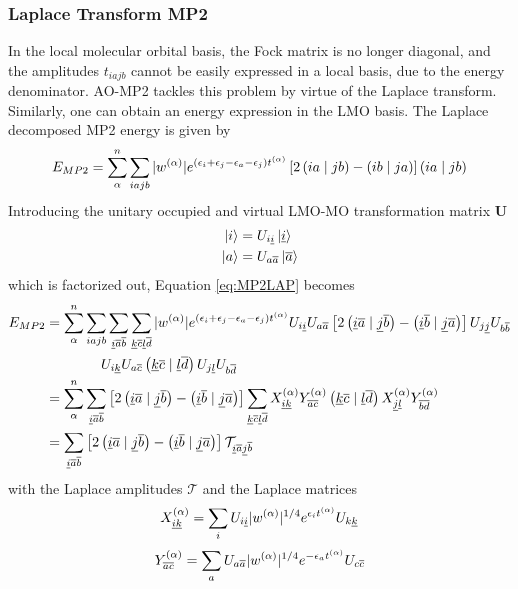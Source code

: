 \subsubsection{Laplace Transform MP2}

In the local molecular orbital basis, the Fock matrix is no longer diagonal, and the amplitudes $t_{iajb}$ cannot be easily expressed in a local basis, due to the energy denominator. AO-MP2 tackles this problem by virtue of the Laplace transform. Similarly, one can obtain an energy expression in the LMO basis. The Laplace decomposed MP2 energy is given by
\begin{equation}
E_{MP2} = \sum_{\alpha}^{n} \sum_{iajb} |w\pa| e^{(\eps_i + \eps_j - \eps_a - \eps_j)t\pa} \left[2\cn{ia}{jb} - \cn{ib}{ja}\right] \cn{ia}{jb}  
\label{eq:MP2LAP}
\end{equation}
\noindent Introducing the unitary occupied and virtual LMO-MO transformation matrix $\mathbf{U}$ 
\begin{align}
\ket{i} &= U_{i\underline{i}} \ket{\underline{i}}
\\
\ket{a} &= U_{a\overline{a}} \ket{\overline{a}}
\end{align}
\noindent which is factorized out, Equation \ref{eq:MP2LAP} becomes
\begin{equation}
\begin{split}
E_{MP2} &= \sum_{\alpha}^{n} \sum_{iajb} \sum_{\uli\ola\olb} \sum_{\ulk\olc\ull\old} |w\pa| e^{(\eps_i + \eps_j - \eps_a - \eps_j)t\pa} U_{i\uli} U_{a\ola} \left[2\cn{\uli\ola}{\ulj\olb} - \cn{\uli\olb}{\ulj\ola}\right] U_{j\ulj} U_{b\olb} \\
& \qquad \qquad U_{i\ulk} U_{a\olc} \cn{\ulk\olc}{\ull\old} U_{j\ull} U_{b\old} \\  
&= \sum_{\alpha}^{n} \sum_{\uli\ola\olb} \left[2\cn{\uli\ola}{\ulj\olb} - \cn{\uli\olb}{\ulj\ola}\right] \sum_{\ulk\olc\ull\old} X_{\uli\ulk}\pa Y_{\ola\olc}\pa \cn{\ulk\olc}{\ull\old} X_{\ulj\ull}\pa Y_{\olb\old}\pa \\
&= \sum_{\uli\ola\olb} \left[2\cn{\uli\ola}{\ulj\olb} - \cn{\uli\olb}{\ulj\ola}\right] \mathcal{T}_{\uli\ola\ulj\olb}
\end{split}
\label{MP2LOCEN}
\end{equation}
\noindent with the Laplace amplitudes $\mathcal{T}$ and the Laplace matrices
\begin{equation}
X_{\underline{i}\underline{k}}^{(\alpha)} = \sum_i U_{i\underline{i}} |w^{(\alpha)}|^{1/4} e^{\epsilon_i t^{(\alpha)}} U_{k\underline{k}}
\end{equation}
\begin{equation}
Y_{\overline{a}\overline{c}}^{(\alpha)} = \sum_a U_{a\overline{a}} |w^{(\alpha)}|^{1/4} e^{-\epsilon_a t^{(\alpha)}} U_{c\overline{c}}
\end{equation}
